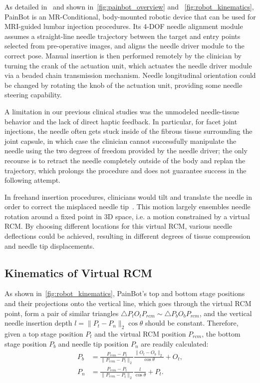 As detailed in~\parencite{liFullyActuatedBodyMounted2020a,liFullyActuatedBodyMounted2020} and shown in~\cref{fig:painbot_overview} and ~\cref{fig:robot_kinematics}, PainBot is an MR-Conditional, body-mounted robotic device that can be used for MRI-guided lumbar injection procedures. Its 4-DOF needle alignment module assumes a straight-line needle trajectory between the target and entry points selected from pre-operative images, and aligns the needle driver module to the correct pose. Manual insertion is then performed remotely by the clinician by turning the crank of the actuation unit, which actuates the needle driver module via a beaded chain transmission mechanism. Needle longitudinal orientation could be changed by rotating the knob of the actuation unit, providing some needle steering capability.

A limitation in our previous clinical studies was the unmodeled needle-tissue behavior and the lack of direct haptic feedback. In particular, for facet joint injections, the needle often gets stuck inside of the fibrous tissue surrounding the joint capsule, in which case the clinician cannot successfully manipulate the needle using the two degrees of freedom provided by the needle driver; the only recourse is to retract the needle completely outside of the body and replan the trajectory, which prolongs the procedure and does not guarantee success in the following attempt.

In freehand insertion procedures, clinicians would tilt and translate the needle in order to correct the misplaced needle tip~\parencite{fritzAugmentedRealityVisualization2012}. This motion largely ensembles needle rotation around a fixed point in 3D space, i.e. a motion constrained by a virtual RCM. By choosing different locations for this virtual RCM, various needle deflections could be achieved, resulting in different degrees of tissue compression and needle tip displacements.

\subsection{Kinematics of Virtual RCM}
\label{sec:chap-2-kinematics}

As shown in~\cref{fig:robot_kinematics}, PainBot's top and bottom stage positions and their projections onto the vertical line, which goes through the virtual RCM point, form a pair of similar triangles $\triangle P_{t}O_{t}P_{rcm} \sim \triangle P_{b}O_{b}P_{rcm}$, and the vertical needle insertion depth $l = \| P_t - P_n \|_2 \cos{\theta}$ should be constant. Therefore, given a top stage position $P_t$ and the virtual RCM position $P_{rcm}$, the bottom stage position $P_b$ and needle tip position $P_n$ are readily calculated:
\begin{align}
  P_b & = \frac{P_{rcm} - P_{t}}{\| P_{rcm} - P_t \|_2} \frac{\| O_t - O_b \|_2}{\cos{\theta}} + O_t, \\
  P_n & = \frac{P_{rcm} - P_{t}}{\| P_{rcm} - P_t \|_2} \frac{l}{\cos{\theta}} + P_t.
\end{align}

